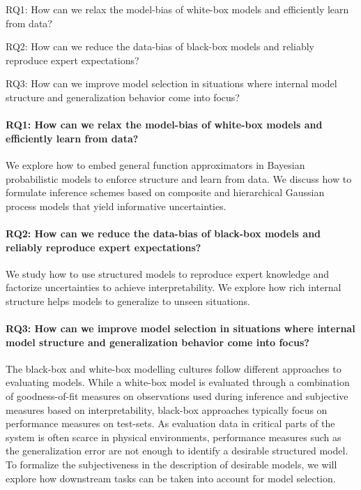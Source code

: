 \begin{RQs}
    \begin{compactdesc}
        \item[RQ1:] How can we relax the model-bias of white-box models and efficiently learn from data?
        \item[RQ2:] How can we reduce the data-bias of black-box models and reliably reproduce expert expectations?
        \item[RQ3:] How can we improve model selection in situations where internal model structure and generalization behavior come into focus?
    \end{compactdesc}
\end{RQs}

\paragraph{RQ1: How can we relax the model-bias of white-box models and efficiently learn from data?}
We explore how to embed general function approximators in Bayesian probabilistic models to enforce structure and learn from data.
We discuss how to formulate inference schemes based on composite and hierarchical Gaussian process models that yield informative uncertainties.

\paragraph{RQ2: How can we reduce the data-bias of black-box models and reliably reproduce expert expectations?}
We study how to use structured models to reproduce expert knowledge and factorize uncertainties to achieve interpretability.
We explore how rich internal structure helps models to generalize to unseen situations.

\paragraph{RQ3: How can we improve model selection in situations where internal model structure and generalization behavior come into focus?}
The black-box and white-box modelling cultures follow different approaches to evaluating models.
While a white-box model is evaluated through a combination of goodness-of-fit measures on observations used during inference and subjective measures based on interpretability, black-box approaches typically focus on performance measures on test-sets.
As evaluation data in critical parts of the system is often scarce in physical environments, performance measures such as the generalization error are not enough to identify a desirable structured model.
To formalize the subjectiveness in the description of desirable models, we will explore how downstream tasks can be taken into account for model selection.



